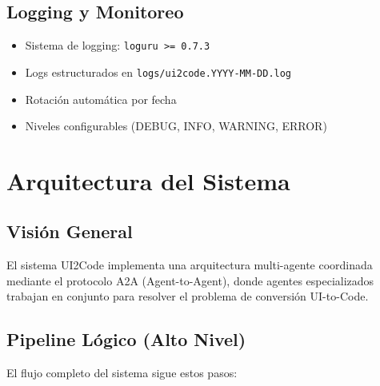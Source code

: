 \documentclass[12pt,a4paper]{article}
\begin{document}
\subsection{Logging y Monitoreo}
\begin{itemize}
    \item Sistema de logging: \texttt{loguru >= 0.7.3}
    \item Logs estructurados en \texttt{logs/ui2code.YYYY-MM-DD.log}
    \item Rotación automática por fecha
    \item Niveles configurables (DEBUG, INFO, WARNING, ERROR)
\end{itemize}

\section{Arquitectura del Sistema}

\subsection{Visión General}

El sistema UI2Code implementa una arquitectura multi-agente coordinada mediante el protocolo A2A (Agent-to-Agent), donde agentes especializados trabajan en conjunto para resolver el problema de conversión UI-to-Code.

\subsection{Pipeline Lógico (Alto Nivel)}

El flujo completo del sistema sigue estos pasos:
\end{document}
